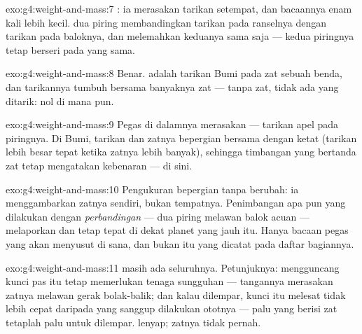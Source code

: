 \begin{solution}{exo:g4:weight-and-mass:7}
: ia merasakan tarikan setempat, dan bacaannya enam kali
lebih kecil.  dua piring membandingkan tarikan pada ranselnya
dengan tarikan pada baloknya, dan  melemahkan keduanya sama saja
--- kedua piringnya tetap berseri pada  yang sama.
\end{solution}

\begin{solution}{exo:g4:weight-and-mass:8}
Benar.  adalah tarikan Bumi pada zat sebuah benda, dan tarikannya
tumbuh bersama banyaknya zat --- tanpa zat, tidak ada yang ditarik:
 nol di mana pun.
\end{solution}

\begin{solution}{exo:g4:weight-and-mass:9}
Pegas di dalamnya merasakan \emph{} --- tarikan apel pada
piringnya. Di Bumi, tarikan dan zatnya bepergian bersama dengan ketat
(tarikan lebih besar tepat ketika zatnya lebih banyak), sehingga
timbangan yang bertanda  zat tetap mengatakan kebenaran ---
di sini.
\end{solution}

\begin{solution}{exo:g4:weight-and-mass:10}
Pengukuran  bepergian tanpa berubah: ia menggambarkan zatnya
sendiri, bukan tempatnya. Penimbangan apa pun yang dilakukan dengan
\emph{perbandingan} ---  dua piring melawan balok acuan ---
melaporkan  dan tetap tepat di dekat planet yang jauh itu. Hanya
bacaan   pegas yang akan menyusut di sana, dan bukan itu yang
dicatat pada daftar bagiannya.
\end{solution}

\begin{solution}{exo:g4:weight-and-mass:11}
 masih ada seluruhnya. Petunjuknya: mengguncang kunci pas itu
tetap memerlukan tenaga sungguhan --- tangannya merasakan zatnya
melawan gerak bolak-balik; dan kalau dilempar, kunci itu melesat tidak
lebih cepat daripada yang sanggup dilakukan ototnya --- palu yang
berisi zat tetaplah palu untuk dilempar.  lenyap; zatnya tidak
pernah.
\end{solution}
